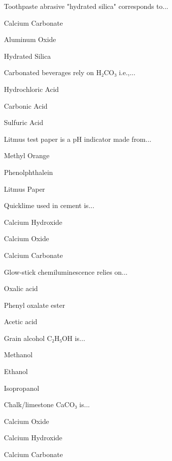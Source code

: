 \begin{enhancedmcq}{Toothpaste abrasive "hydrated silica" corresponds to...}
\item Calcium Carbonate
\item Aluminum Oxide
\item Hydrated Silica

\end{enhancedmcq}
\begin{enhancedmcq}{Carbonated beverages rely on H₂CO₃ i.e.,...}
\item Hydrochloric Acid
\item Carbonic Acid
\item Sulfuric Acid

\end{enhancedmcq}
\begin{enhancedmcq}{Litmus test paper is a pH indicator made from...}
\item Methyl Orange
\item Phenolphthalein
\item Litmus Paper

\end{enhancedmcq}
\begin{enhancedmcq}{Quicklime used in cement is...}
\item Calcium Hydroxide
\item Calcium Oxide
\item Calcium Carbonate

\end{enhancedmcq}
\begin{enhancedmcq}{Glow‑stick chemiluminescence relies on...}
\item Oxalic acid
\item Phenyl oxalate ester
\item Acetic acid

\end{enhancedmcq}
\begin{enhancedmcq}{Grain alcohol C₂H₅OH is...}
\item Methanol
\item Ethanol
\item Isopropanol

\end{enhancedmcq}
\begin{enhancedmcq}{Chalk/limestone CaCO₃ is...}
\item Calcium Oxide
\item Calcium Hydroxide
\item Calcium Carbonate

\end{enhancedmcq}
